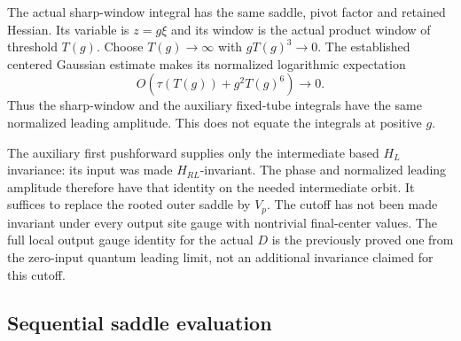 The actual sharp-window integral has the same saddle,
pivot factor and retained Hessian. Its variable is $z=g\xi$
and its window is the actual product window of threshold
$T(g)$. Choose $T(g)\to\infty$ with $gT(g)^3\to0$.
The established centered Gaussian estimate makes its
normalized logarithmic expectation
\begin{equation}
                          O\!\left(\tau(T(g))+g^2T(g)^6\right)
                              \longrightarrow0.
 \label{olc-sharp-leading}
\end{equation}
Thus the sharp-window and the auxiliary fixed-tube integrals
have the same normalized leading amplitude. This does not
equate the integrals at positive $g$.

The auxiliary first pushforward supplies only the intermediate
based $H_L$ invariance: its input was made $H_{RL}$-invariant.
The phase and normalized leading amplitude therefore have
that identity on the needed intermediate orbit. It suffices
to replace the rooted outer saddle by $V_p$.
The cutoff has not been made invariant under every output
site gauge with nontrivial final-center values. The full
local output gauge identity for the actual $D$ is the
previously proved one from the zero-input quantum leading
limit, not an additional invariance claimed for this cutoff.

\subsection{Sequential saddle evaluation}
\label{olc-proof-section}

